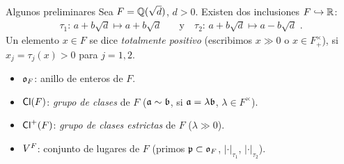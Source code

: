 \begin{frame}{Algunos preliminares}
	Sea $F=\bb Q(\sqrt d)$, $d>0$. Existen dos inclusiones
	$F\hookrightarrow\bb R$:
	\begin{align*}
		\tau_1:\,a+b\sqrt d\mapsto a+b\sqrt d & \quad\text{y}\quad
			\tau_2:\,a+b\sqrt d\mapsto a-b\sqrt d
		\text{ .}
	\end{align*}
	Un elemento $x\in F$ se dice \emph{totalmente positivo} (escribimos
	$x\gg 0$ o $x\in F^{\times}_{+}$), si $x_{j}=\tau_j(x)>0$ para $j=1,2$.
	\begin{defNotacion}\label{def:notaciontotalmentereal}
		\begin{itemize}
			\item $\oka{F}$: anillo de enteros de $F$.
			\item $\Class{F}$: \emph{grupo de clases} de $F$
				($\frak{a}\sim\frak{b}$, si
				$\frak{a}=\lambda\frak{b}$,
				$\lambda\in F^{\times}$).
			\item $\pClass{F}$: \emph{grupo de clases estrictas}
				de $F$ ($\lambda\gg0$).
			\item $\lugares{F}$: conjunto de lugares de  $F$
				(primos $\frak p\subset \oka F$,
				$|\cdot|_{\tau_1}$, $|\cdot|_{\tau_2}$).
		\end{itemize}
	\end{defNotacion}
\end{frame}

